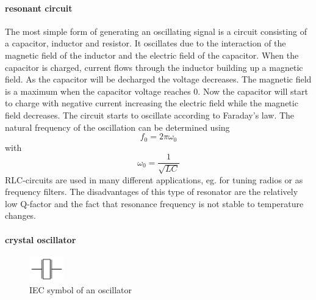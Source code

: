 \paragraph{resonant circuit\\}
The most simple form of generating an oscillating signal is a circuit consisting of a capacitor, inductor and resistor. It oscillates due to the interaction of the magnetic field of the inductor and the electric field of the capacitor. When the capacitor is charged, current flows through the inductor building up a magnetic field. As the capacitor will be decharged the voltage decreases. The magnetic field is a maximum when the capacitor voltage reaches 0. Now the capacitor will start to charge with negative current increasing the electric field while the magnetic field decreases. The circuit starts to oscillate according to Faraday's law. The natural frequency of the oscillation can be determined using
\begin{equation}
f_0=2\pi\omega_0
\end{equation}
with
\begin{equation}
\omega_0=\frac{1}{\sqrt{LC}}
\end{equation}
RLC-circuits are used in many different applications, eg. for tuning radios or as frequency filters. The disadvantages of this type of resonator are the relatively low Q-factor and the fact that resonance frequency is not stable to temperature changes.
\paragraph{crystal oscillator}

\begin{figure}[htbp]
\begin{center}
\includegraphics[width=1.5cm,keepaspectratio=true]{bilder/png/crystaloscillatorsymbol}
\caption{IEC symbol of an oscillator}
\label{fig:crystaloscillatorsymbol}
\end{center}
\end{figure}

